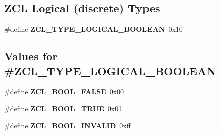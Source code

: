 \subsection*{Z\-C\-L Logical (discrete) Types}
\begin{DoxyCompactItemize}
\item 
\hypertarget{group__zcl__types_gaf53d04b9e7617803f30ec7cea3539056}{\#define {\bfseries Z\-C\-L\-\_\-\-T\-Y\-P\-E\-\_\-\-L\-O\-G\-I\-C\-A\-L\-\_\-\-B\-O\-O\-L\-E\-A\-N}~0x10}\label{group__zcl__types_gaf53d04b9e7617803f30ec7cea3539056}

\end{DoxyCompactItemize}
\subsection*{Values for \#Z\-C\-L\-\_\-\-T\-Y\-P\-E\-\_\-\-L\-O\-G\-I\-C\-A\-L\-\_\-\-B\-O\-O\-L\-E\-A\-N}
\begin{DoxyCompactItemize}
\item 
\hypertarget{group__zcl__types_ga415c6e6b5f1ee8afa117a28e9dbbaf91}{\#define {\bfseries Z\-C\-L\-\_\-\-B\-O\-O\-L\-\_\-\-F\-A\-L\-S\-E}~0x00}\label{group__zcl__types_ga415c6e6b5f1ee8afa117a28e9dbbaf91}

\item 
\hypertarget{group__zcl__types_ga10619c77a809e680384955e6173e3512}{\#define {\bfseries Z\-C\-L\-\_\-\-B\-O\-O\-L\-\_\-\-T\-R\-U\-E}~0x01}\label{group__zcl__types_ga10619c77a809e680384955e6173e3512}

\item 
\hypertarget{group__zcl__types_gaa605ed8ffc1519c222f5cf380967dd54}{\#define {\bfseries Z\-C\-L\-\_\-\-B\-O\-O\-L\-\_\-\-I\-N\-V\-A\-L\-I\-D}~0xff}\label{group__zcl__types_gaa605ed8ffc1519c222f5cf380967dd54}

\end{DoxyCompactItemize}
